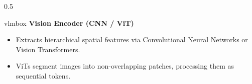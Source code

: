 \documentclass[10pt]{beamer}
\begin{document}
\begin{frame}[t]
\begin{columns}[T]
\begin{column}{0.5\textwidth}
        \begin{beamercolorbox}[sep=5pt,shadow=true,rounded=true]{vlmbox}
            \textbf{Vision Encoder (CNN / ViT)}
            \vspace{0.1cm}
            \scriptsize
            \begin{itemize}
                \setlength\itemsep{0.2em}
                \item Extracts hierarchical spatial features via Convolutional Neural Networks or Vision Transformers.
                \item ViTs segment images into non-overlapping patches, processing them as sequential tokens.
            \end{itemize}
        \end{beamercolorbox}
    \end{column}
\end{columns}
\end{frame}
\end{document}
